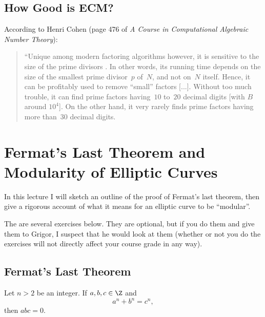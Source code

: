 \documentclass[11pt]{report}
\begin{document}
\section{How Good is ECM?}

According to Henri Cohen (page 476 of {\em A Course in Computational
    Algebraic Number Theory}):
\begin{quote}
  ``Unique among modern factoring algorithms however, it is sensitive to
  the size of the prime divisors .  In other words, its running time
  depends on the size of the smallest prime divisor~$p$ of~$N$, and not
  on~$N$ itself.  Hence, it can be profitably used to remove ``small''
  factors [...]. Without too much trouble, it can find prime factors
  having~$10$ to~$20$ decimal digits [with $B$ around $10^4$].
  On the other hand, it very rarely finds prime factors having
  more than~$30$ decimal digits.
\end{quote}




\chapter{Fermat's Last Theorem and Modularity of Elliptic Curves}



In this lecture I will sketch an outline of the proof of Fermat's
last theorem, then give a  rigorous account of what
it means for an elliptic curve to be ``modular''.

The are several exercises below.  They are
optional, but if you do them and give them to Grigor, I suspect that
he would look at them (whether or not you do the exercises will
not directly affect your course grade in any way).

\section{Fermat's Last Theorem}

\begin{theorem}
  Let $n>2$ be an integer.  If $a, b, c\in\Z$ and
  $$a^n + b^n = c^n,$$
  then $abc=0$.
\end{theorem}
\end{document}
